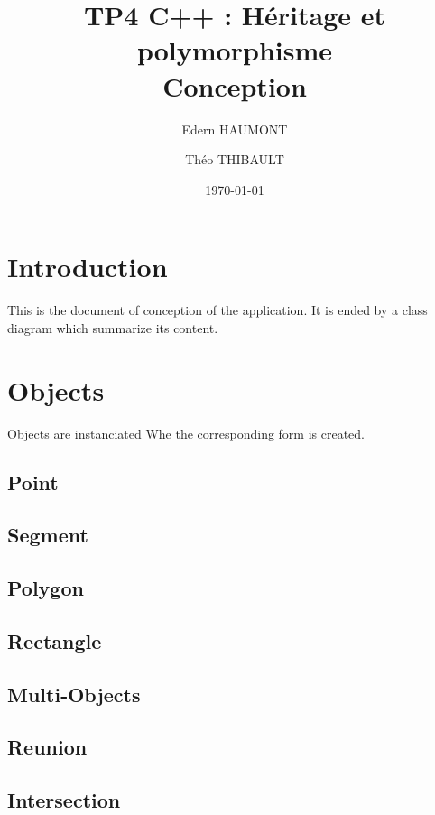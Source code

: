 \documentclass[a4paper, 12pts]{article}
\title{TP4 C++ : Héritage et polymorphisme \\
    \large Conception}
\author{Edern HAUMONT}
\author{Théo THIBAULT}
\affil{B3133}
\date{\today}
\begin{document}

\maketitle



\section{Introduction}
	This is the document of conception of the application. It is ended by a class diagram which summarize its content.

\section{Objects}
    Objects are instanciated Whe the corresponding form is created.
    \subsection{Point}
    \subsection{Segment}
    \subsection{Polygon}
    \subsection{Rectangle}
    \subsection{Multi-Objects}
    \subsection{Reunion}
    \subsection{Intersection}
\end{document}
